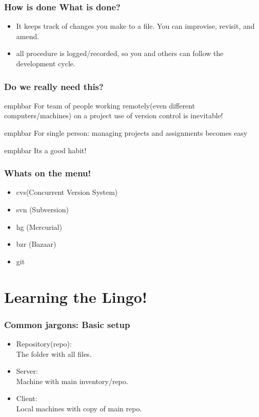 \documentclass[14pt,compress]{beamer}
\newcommand{\emphbar}[1]
{\begin{beamercolorbox}[rounded=true]{emphbar} 
      {#1}
 \end{beamercolorbox}
}
\begin{document}
\begin{frame}
  \frametitle{How is done What is done?}
  \begin{itemize}
  \item It keeps track of changes you make to a file. You can improvise, revisit, and amend.
  \item all procedure is logged/recorded, so you and others can follow the development cycle.
  \end{itemize}  
\end{frame}

\begin{frame}
  \frametitle{Do we really need this?}
  \emphbar{For team of people working remotely(even different computers/machines) on a project use of version control is inevitable!}
  \emphbar{For single person: managing projects and assignments becomes easy}
  \pause
  \emphbar{Its a good habit!}
\end{frame}

\begin{frame}
  \frametitle{Whats on the menu!}
  \begin{itemize}
  \item cvs(Concurrent Version System)
  \item svn (Subversion)
  \item hg (Mercurial)
  \item bzr (Bazaar)
  \item git
  \end{itemize}
\end{frame}

\section{Learning the Lingo!}

\begin{frame}
  \frametitle{Common jargons: Basic setup}
  \begin{itemize}
  \item Repository(repo):\\
        The folder with all files.
  \item Server:\\
        Machine with main inventory/repo.
  \item Client:\\
        Local machines with copy of main repo.
  \end{itemize}
\end{frame}
\end{document}
